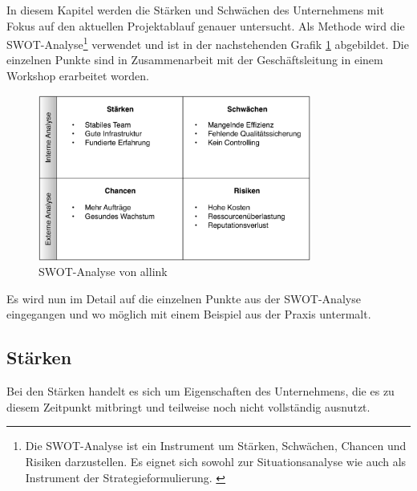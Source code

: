In diesem Kapitel werden die Stärken und Schwächen des Unternehmens mit Fokus
auf den aktuellen Projektablauf genauer untersucht. Als Methode
wird die SWOT-Analyse\footnote{Die SWOT-Analyse ist ein Instrument um
Stärken, Schwächen, Chancen und Risiken darzustellen. Es eignet sich sowohl zur Situationsanalyse
wie auch als Instrument der Strategieformulierung. \citealp*[Vgl.][S. 134]{homburg2000quantitative}} 
verwendet und ist in der nachstehenden Grafik \ref{pic:swot_analyse} abgebildet.
Die einzelnen Punkte sind in Zusammenarbeit mit der Geschäftsleitung in einem Workshop
erarbeitet worden.


\begin{figure}[htbp]
\begin{center}
\includegraphics[width=0.8\textwidth,angle=0]{./bilder/analyse/swot_analyse.pdf}
\caption[SWOT-Analyse von allink]{SWOT-Analyse von allink\footnotemark}
\label{pic:swot_analyse}
\end{center}
\end{figure}

Es wird nun im Detail auf die einzelnen Punkte aus der SWOT-Analyse eingegangen
und wo möglich mit einem Beispiel aus der Praxis untermalt.

\subsection{Stärken}
Bei den Stärken handelt es sich um Eigenschaften des Unternehmens,
die es zu diesem Zeitpunkt mitbringt und teilweise noch nicht vollständig
ausnutzt. 

